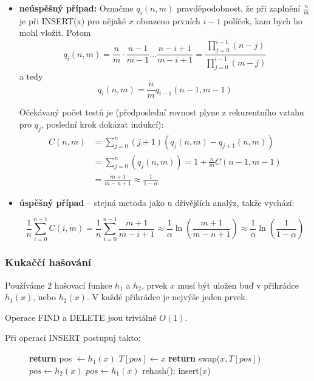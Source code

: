 \documentclass[11pt]{report} %
\numberwithin{equation}{section}
\begin{document}
\begin{itemize}
	\item \textbf{neúspěšný případ:} Označme $q_i(n,m)$ pravděpodobnost, že při zaplnění $\frac{n}{m}$ je při INSERT(x) pro nějaké $x$ obsazeno prvních $i-1$ políček, kam bych ho mohl vložit. Potom
	$$q_i(n,m) = 
	\frac{n}{m}\cdot\frac{n-1}{m-1}\dots\frac{n-i+1}{m-i+1} = \frac{\prod_{j=0}^{i-1}(n-j)}{\prod_{j=0}^{i-1}(m-j)}$$
	a tedy $$q_i(n,m)=\frac{n}{m}q_{i-1}(n-1,m-1)$$
	
	Očekávaný počet testů je (předposlední rovnost plyne z rekurentního
	vztahu pro $q_j$, poslední krok dokázat indukcí):
	\begin{align*}
	C(n,m)&=\sum_{j=0}^n(j+1) (q_j(n,m) - q_{j+1}(n,m)) \\ 
	&=\sum_{j=0}^n(q_j(n,m)) = 1+\frac{n}{m} C(n-1,m-1)\\
	&= \frac{m+1}{m-n+1} \approx \frac{1}{1 - \alpha}
	\end{align*}
	
	\item \textbf{úspěšný případ} -- stejná metoda jako u dřívějších analýz, takže vychází:
	
	$$\frac{1}{n}\sum_{i=0}^{n-1}C(i,m)=\frac{1}{n}\sum_{i=0}^{n-1}\frac{m+1}{m-i+1}\approx\frac{1}{\alpha}\ln\left(\frac{m+1}{m-n+1}\right)\approx\frac{1}{\alpha}\ln\left(\frac{1}{1-\alpha}\right)$$
	
\end{itemize}

\subsubsection{Kukaččí hašování}
Používáme 2 hašovací funkce $h_1$ a $h_2$, prvek $x$ musí být uložen buď v přihrádce $h_1(x)$, nebo $h_2(x)$. V každé přihrádce je nejvýše jeden prvek.

Operace FIND a DELETE jsou triviálně $O(1)$.

Při operaci INSERT postupuj takto:
\begin{figure}[H]
	\centering
	\begin{minipage}{.7\linewidth}
		\begin{algorithm}[H]
			\caption{}
			\begin{algorithmic}[1]
					\State \textbf{return}
				\EndIf
				\State pos $\gets h_1(x)$
						\State $T[pos] \gets x$
						\State \textbf{return}
					\EndIf
					\State swap($x,T[pos]$)
						\State $pos \gets h_2(x)$
					\Else
						\State $pos \gets h_1(x)$
					\EndIf
				\EndFor
				\State rehash(); insert($x$)
			\end{algorithmic}
		\end{algorithm}				
	\end{minipage}
\end{figure}
\end{document}
